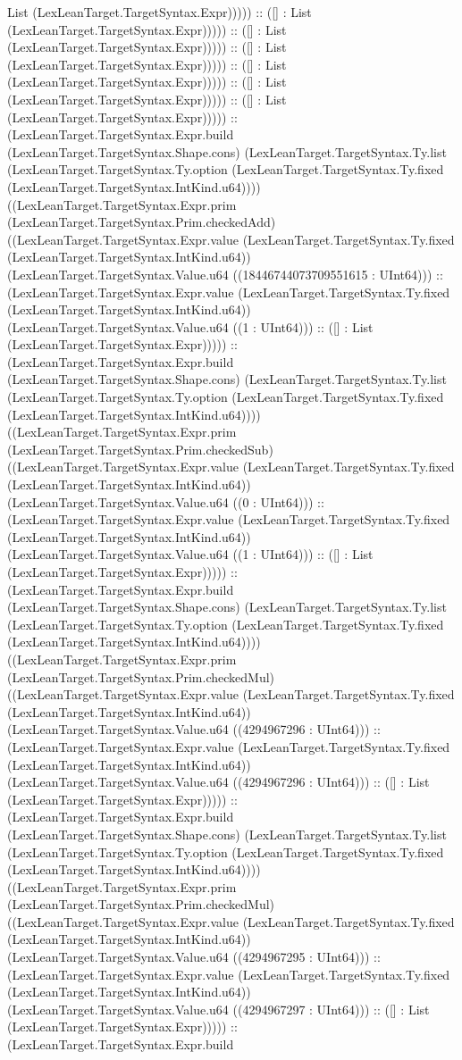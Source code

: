 \documentclass[11pt]{article}
\begin{document}
List (LexLeanTarget.TargetSyntax.Expr))))) :: ([] : List (LexLeanTarget.TargetSyntax.Expr))))) :: ([] : List (LexLeanTarget.TargetSyntax.Expr))))) :: ([] : List (LexLeanTarget.TargetSyntax.Expr))))) :: ([] : List (LexLeanTarget.TargetSyntax.Expr))))) :: ([] : List (LexLeanTarget.TargetSyntax.Expr))))) :: ([] : List (LexLeanTarget.TargetSyntax.Expr))))) :: (LexLeanTarget.TargetSyntax.Expr.build (LexLeanTarget.TargetSyntax.Shape.cons) (LexLeanTarget.TargetSyntax.Ty.list (LexLeanTarget.TargetSyntax.Ty.option (LexLeanTarget.TargetSyntax.Ty.fixed (LexLeanTarget.TargetSyntax.IntKind.u64)))) ((LexLeanTarget.TargetSyntax.Expr.prim (LexLeanTarget.TargetSyntax.Prim.checkedAdd) ((LexLeanTarget.TargetSyntax.Expr.value (LexLeanTarget.TargetSyntax.Ty.fixed (LexLeanTarget.TargetSyntax.IntKind.u64)) (LexLeanTarget.TargetSyntax.Value.u64 ((18446744073709551615 : UInt64))) :: (LexLeanTarget.TargetSyntax.Expr.value (LexLeanTarget.TargetSyntax.Ty.fixed (LexLeanTarget.TargetSyntax.IntKind.u64)) (LexLeanTarget.TargetSyntax.Value.u64 ((1 : UInt64))) :: ([] : List (LexLeanTarget.TargetSyntax.Expr))))) :: (LexLeanTarget.TargetSyntax.Expr.build (LexLeanTarget.TargetSyntax.Shape.cons) (LexLeanTarget.TargetSyntax.Ty.list (LexLeanTarget.TargetSyntax.Ty.option (LexLeanTarget.TargetSyntax.Ty.fixed (LexLeanTarget.TargetSyntax.IntKind.u64)))) ((LexLeanTarget.TargetSyntax.Expr.prim (LexLeanTarget.TargetSyntax.Prim.checkedSub) ((LexLeanTarget.TargetSyntax.Expr.value (LexLeanTarget.TargetSyntax.Ty.fixed (LexLeanTarget.TargetSyntax.IntKind.u64)) (LexLeanTarget.TargetSyntax.Value.u64 ((0 : UInt64))) :: (LexLeanTarget.TargetSyntax.Expr.value (LexLeanTarget.TargetSyntax.Ty.fixed (LexLeanTarget.TargetSyntax.IntKind.u64)) (LexLeanTarget.TargetSyntax.Value.u64 ((1 : UInt64))) :: ([] : List (LexLeanTarget.TargetSyntax.Expr))))) :: (LexLeanTarget.TargetSyntax.Expr.build (LexLeanTarget.TargetSyntax.Shape.cons) (LexLeanTarget.TargetSyntax.Ty.list (LexLeanTarget.TargetSyntax.Ty.option (LexLeanTarget.TargetSyntax.Ty.fixed (LexLeanTarget.TargetSyntax.IntKind.u64)))) ((LexLeanTarget.TargetSyntax.Expr.prim (LexLeanTarget.TargetSyntax.Prim.checkedMul) ((LexLeanTarget.TargetSyntax.Expr.value (LexLeanTarget.TargetSyntax.Ty.fixed (LexLeanTarget.TargetSyntax.IntKind.u64)) (LexLeanTarget.TargetSyntax.Value.u64 ((4294967296 : UInt64))) :: (LexLeanTarget.TargetSyntax.Expr.value (LexLeanTarget.TargetSyntax.Ty.fixed (LexLeanTarget.TargetSyntax.IntKind.u64)) (LexLeanTarget.TargetSyntax.Value.u64 ((4294967296 : UInt64))) :: ([] : List (LexLeanTarget.TargetSyntax.Expr))))) :: (LexLeanTarget.TargetSyntax.Expr.build (LexLeanTarget.TargetSyntax.Shape.cons) (LexLeanTarget.TargetSyntax.Ty.list (LexLeanTarget.TargetSyntax.Ty.option (LexLeanTarget.TargetSyntax.Ty.fixed (LexLeanTarget.TargetSyntax.IntKind.u64)))) ((LexLeanTarget.TargetSyntax.Expr.prim (LexLeanTarget.TargetSyntax.Prim.checkedMul) ((LexLeanTarget.TargetSyntax.Expr.value (LexLeanTarget.TargetSyntax.Ty.fixed (LexLeanTarget.TargetSyntax.IntKind.u64)) (LexLeanTarget.TargetSyntax.Value.u64 ((4294967295 : UInt64))) :: (LexLeanTarget.TargetSyntax.Expr.value (LexLeanTarget.TargetSyntax.Ty.fixed (LexLeanTarget.TargetSyntax.IntKind.u64)) (LexLeanTarget.TargetSyntax.Value.u64 ((4294967297 : UInt64))) :: ([] : List (LexLeanTarget.TargetSyntax.Expr))))) :: (LexLeanTarget.TargetSyntax.Expr.build 
\end{document}
